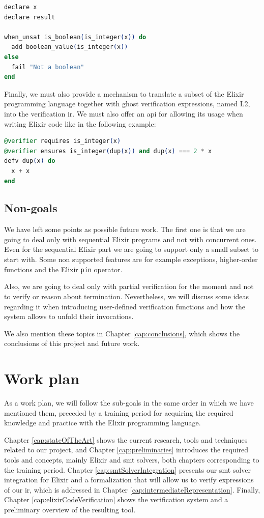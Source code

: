 \begin{lstlisting}[language=elixir,numbers=none,frame=none]
declare x
declare result 

when_unsat is_boolean(is_integer(x)) do 
  add boolean_value(is_integer(x))
else 
  fail "Not a boolean"
end
\end{lstlisting}

Finally, we must also provide a mechanism to translate a subset of the Elixir
programming language together with ghost verification expressions, named L2,
into the verification \gls{ir}. We must also offer an \gls{api} for allowing its
usage when writing Elixir code like in the following example:

\begin{lstlisting}[language=elixir,numbers=none,frame=none]
@verifier requires is_integer(x)
@verifier ensures is_integer(dup(x)) and dup(x) === 2 * x
defv dup(x) do
  x + x
end
\end{lstlisting}

\subsection{Non-goals}

We have left some points as possible future work. The first one is that we are
going to deal only with sequential Elixir programs and not with concurrent ones.
Even for the sequential Elixir part we are going to support only a small subset 
to start with. Some non supported features are for example exceptions,
higher-order functions and the Elixir \verb|pin| operator.

Also, we are going to deal only with partial verification for the moment and not
to verify or reason about termination. Nevertheless, we will discuss some ideas 
regarding it when introducing user-defined verification functions and how the 
system allows to unfold their invocations.  

We also mention these topics in Chapter \ref{cap:conclusions}, which shows the 
conclusions of this project and future work.

\section{Work plan}

As a work plan, we will follow the sub-goals in the same order in which we have
mentioned them, preceded by a training period for acquiring the required
knowledge and practice with the Elixir programming language.

Chapter \ref{cap:stateOfTheArt} shows the current research, tools and techniques
related to our project, and Chapter \ref{cap:preliminaries} introduces the
required tools and concepts, mainly Elixir and \acrshort{smt} solvers, both
chapters corresponding to the training period. Chapter
\ref{cap:smtSolverIntegration} presents our \acrshort{smt} solver integration
for Elixir and a formalization that will allow us to verify expressions of our
\gls{ir}, which is addressed in Chapter \ref{cap:intermediateRepresentation}.
Finally, Chapter \ref{cap:elixirCodeVerification} shows the verification system
and a preliminary overview of the resulting tool.
